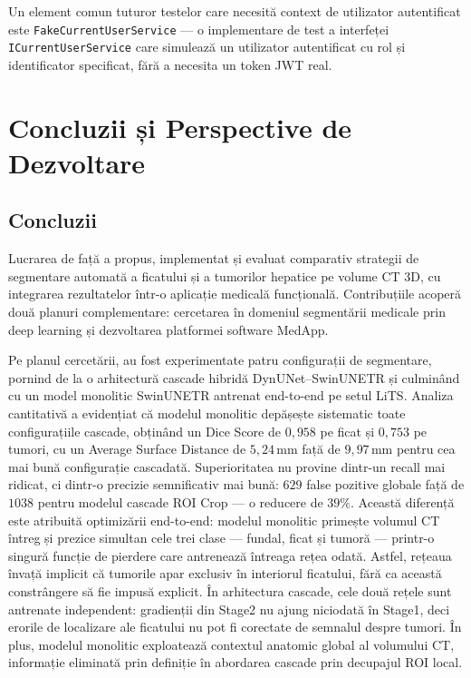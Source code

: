 \documentclass[12pt, a4paper]{report}
\begin{document}
Un element comun tuturor testelor care necesită context de utilizator
autentificat este \texttt{FakeCurrentUserService} --- o implementare
de test a interfeței \texttt{ICurrentUserService} care simulează un
utilizator autentificat cu rol și identificator specificat, fără a
necesita un token JWT real.


\chapter{Concluzii și Perspective de Dezvoltare}

\section{Concluzii}

Lucrarea de față a propus, implementat și evaluat comparativ strategii de
segmentare automată a ficatului și a tumorilor hepatice pe volume CT 3D,
cu integrarea rezultatelor într-o aplicație medicală funcțională. Contribuțiile
acoperă două planuri complementare: cercetarea în domeniul segmentării medicale
prin deep learning și dezvoltarea platformei software MedApp.

Pe planul cercetării, au fost experimentate patru configurații de segmentare,
pornind de la o arhitectură cascade hibridă DynUNet--SwinUNETR și culminând cu
un model monolitic SwinUNETR antrenat end-to-end pe setul LiTS. Analiza
cantitativă a evidențiat că modelul monolitic depășește sistematic toate
configurațiile cascade, obținând un Dice Score de $0{,}958$ pe ficat și
$0{,}753$ pe tumori, cu un Average Surface Distance de $5{,}24$\,mm față de
$9{,}97$\,mm pentru cea mai bună configurație cascadată. Superioritatea nu
provine dintr-un recall mai ridicat, ci dintr-o precizie semnificativ mai bună:
$629$ false pozitive globale față de $1038$ pentru modelul cascade ROI Crop ---
o reducere de $39\%$. Această diferență este atribuită optimizării end-to-end: modelul monolitic primește volumul CT întreg și prezice simultan cele trei clase --- fundal, ficat și tumoră --- printr-o singură funcție de pierdere care antrenează întreaga rețea odată. Astfel, rețeaua învață implicit că tumorile apar exclusiv în interiorul ficatului, fără ca această constrângere să fie impusă explicit. În arhitectura cascade, cele două rețele sunt antrenate independent: gradienții din Stage2 nu ajung niciodată în Stage1, deci erorile de localizare ale ficatului nu pot fi corectate de semnalul despre tumori. În plus, modelul monolitic exploatează contextul anatomic global al volumului CT, informație eliminată prin definiție în abordarea cascade prin decupajul ROI local.
\end{document}
